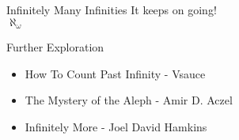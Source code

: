 \documentclass[compress,17pt]{beamer}
\begin{document}
\begin{frame}{Infinitely Many Infinities}
  \centering
  It keeps on going! \pause \\
  $\aleph_\omega$
\end{frame}

\begin{frame}{Further Exploration}
  \begin{itemize}
    \item How To Count Past Infinity - Vsauce
    \item The Mystery of the Aleph - Amir D. Aczel
    \item Infinitely More - Joel David Hamkins
  \end{itemize}
\end{frame}












\end{document}
